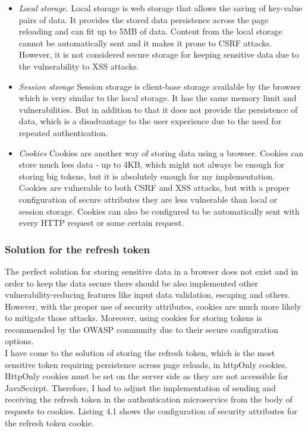 \begin{itemize}
    \item \emph{Local storage.} Local storage is web storage that allows the saving of key-value pairs of data. It provides the stored data persistence across the page reloading and can fit up to 5MB of data. Content from the local storage cannot be automatically sent and it makes it prone to CSRF attacks. However, it is not considered secure storage for keeping sensitive data due to the vulnerability to XSS attacks.
    \item \emph{Session storage} Session storage is client-base storage available by the browser which is very similar to the local storage. It has the same memory limit and vulnerabilities. But in addition to that it does not provide the persistence of data, which is a disadvantage to the user experience due to the need for repeated authentication.
    \item \emph{Cookies} Cookies are another way of storing data using a browser. Cookies can store much less data - up to 4KB, which might not always be enough for storing big tokens, but it is absolutely enough for my implementation. Cookies are vulnerable to both CSRF and XSS attacks, but with a proper configuration of secure attributes they are less vulnerable than local or session storage. Cookies can also be configured to be automatically sent with every HTTP request or some certain request.
\end{itemize}

\subsubsection{Solution for the refresh token} The perfect solution for storing sensitive data in a browser does not exist and in order to keep the data secure there should be also implemented other vulnerability-reducing features like input data validation, escaping and others. However, with the proper use of security attributes, cookies are much more likely to mitigate those attacks. \cite{ls-vs-cookies} Moreover, using cookies for storing tokens is recommended by the OWASP \cite{owasp} community due to their secure configuration options. \cite{ls-vs-cookies-2} \\
I have come to the solution of storing the refresh token, which is the most sensitive token requiring persistence across page reloads, in httpOnly cookies. HttpOnly cookies must be set on the server side as they are not accessible for JavaSccirpt. Therefore, I had to adjust the implementation of sending and receiving the refresh token in the authentication microservice from the body of requests to cookies. Listing 4.1 shows the configuration of security attributes for the refresh token cookie.

